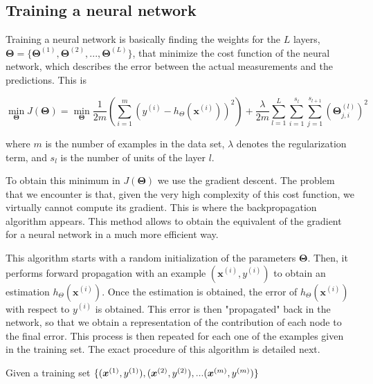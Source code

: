 \documentclass[a4paper, report, oneside, UKenglish]{memoir}
\DeclarePairedDelimiter{\set}{\lbrace}{\rbrace} %
\newcommand{\x}{\boldsymbol{x}}
\newcommand{\bTheta}{\boldsymbol{\Theta}}
\begin{document}
\subsection{Training a neural network}
Training a neural network is basically finding the weights for the $L$ layers, $\bTheta = \{\bTheta^{(1)}, \bTheta^{(2)}, ..., \bTheta^{(L)}\}$, that minimize the cost function of the neural network, which describes the error between the actual measurements and the predictions. This is

\begin{equation}
    \min_{\bTheta} J(\bTheta) = \min_{\bTheta} \frac{1}{2m} \left(\sum_{i=1}^{m} \left(y^{(i)} - h_\Theta (\x^{(i)}) \right)^2 \right) + \frac{\lambda}{2m} \sum_{l=1}^{L} \sum_{i=1}^{s_l} \sum_{j=1}^{s_{l+1}} (\bTheta_{j,i}^{(l)})^2
\end{equation}

where $m$ is the number of examples in the data set, $\lambda$ denotes the regularization term, and $s_l$ is the number of units of the layer $l$.

To obtain this minimum in $J(\bTheta)$ we use the gradient descent. The problem that we encounter is that, given the very high complexity of this cost function, we virtually cannot compute its gradient. This is where the backpropagation algorithm appears. This method allows to obtain the equivalent of the gradient for a neural network in a much more efficient way.

This algorithm starts with a random initialization of the parameters $\bTheta$. Then, it performs forward propagation with an example $(\x^{(i)}, y^{(i)})$ to obtain an estimation $h_\Theta(\x^{(i)})$. Once the estimation is obtained, the error of $h_\Theta(\x^{(i)})$ with respect to $y^{(i)}$ is obtained. This error is then "propagated" back in the network, so that we obtain a representation of the contribution of each node to the final error. This process is then repeated for each one of the examples given in the training set. The exact procedure of this algorithm is detailed next.

Given a training set $\set{(\x^{(1)}, y^{(1)}), (\x^{(2)}, y^{(2)}), ... (\x^{(m)}, y^{(m)})}$
\end{document}
